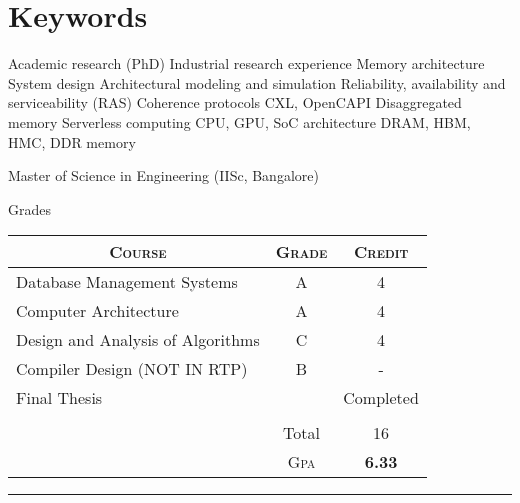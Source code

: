 \documentclass[a4paper,10pt]{article} %
\begin{document}
\section{Keywords}
\checkmark Academic research (PhD) \quad 
\checkmark Industrial research experience \quad 
\checkmark Memory architecture \quad
\checkmark System design \quad 
\checkmark Architectural modeling and simulation \quad
\checkmark Reliability, availability and serviceability (RAS) \quad 
\checkmark Coherence protocols \quad
\checkmark CXL, OpenCAPI \quad
\checkmark Disaggregated memory \quad
\checkmark Serverless computing \quad
\checkmark CPU, GPU, SoC architecture \quad
\checkmark DRAM, HBM, HMC, DDR memory




\iffalse

\newpage


\par{\centering\Large \hypertarget{iisc}{Master of Science in  Engineering (IISc, Bangalore)}\par}\large{\centering Grades\par}\normalsize

\begin{center}
\begin{tabular}{lcc}
\multicolumn{1}{c}{\textsc{Course}} & \textsc{Grade}&\textsc{Credit}\\ \hline
Database Management Systems & A & 4\\
Computer Architecture & A & 4\\
Design and Analysis of Algorithms & C & 4\\
Compiler Design (NOT IN RTP) & B & -\\
Final Thesis &  & Completed \\
&&\\
& Total & 16\\\cline{2-3}
&\textsc{Gpa}&\textbf{6.33}
\end{tabular}
\end{center}
\bigskip
\hrule
\bigskip

\end{document}
